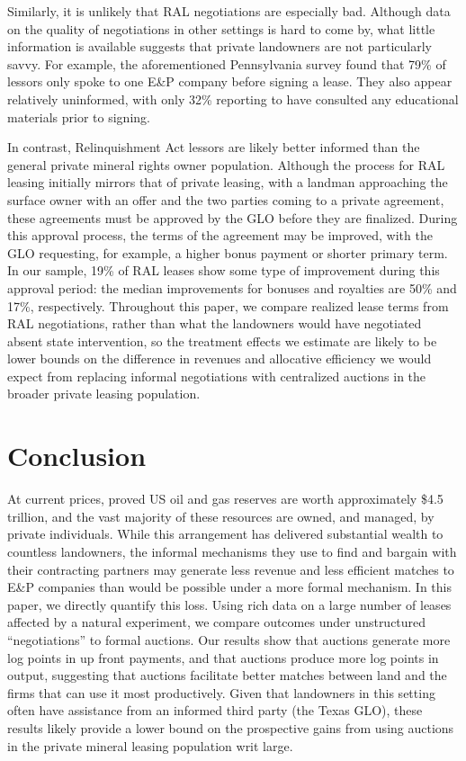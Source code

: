 \documentclass[12pt]{article}
\newcommand{\inputy}[1]{\unskip}
\begin{document}
Similarly, it is unlikely that RAL negotiations are especially bad.  Although data on the quality of negotiations in other settings is hard to come by, what little information is available suggests that private landowners are not particularly savvy.  For example, the aforementioned Pennsylvania survey found that 79\% of lessors only spoke to one E\&P company before signing a lease. They also appear relatively uninformed, with only 32\% reporting to have consulted any educational materials prior to signing. 

In contrast, Relinquishment Act lessors are likely better informed than the general private mineral rights owner population. Although the process for RAL leasing initially mirrors that of private leasing, with a landman approaching the surface owner with an offer and the two parties coming to a private agreement, these agreements must be approved by the GLO before they are finalized. During this approval process, the terms of the agreement may be improved, with the GLO requesting, for example, a higher bonus payment or shorter primary term. In our sample, 19\% of RAL leases show some type of improvement during this approval period: the median improvements for bonuses and royalties are 50\% and 17\%, respectively. Throughout this paper, we compare realized lease terms from RAL negotiations, rather than what the landowners would have negotiated absent state intervention, so the treatment effects we estimate are likely to be lower bounds on the difference in revenues and allocative efficiency we would expect from replacing informal negotiations with centralized auctions in the broader private leasing population.

\section{Conclusion}\label{sec:Conclusion}

At current prices, proved US oil and gas reserves are worth approximately \$4.5 trillion, and the vast majority of these resources are owned, and managed, by private individuals.  While this arrangement has delivered substantial wealth to countless landowners, the informal mechanisms they use to find and bargain with their contracting partners may generate less revenue and less efficient matches to E\&P companies than would be possible under a more formal mechanism.  In this paper, we directly quantify this loss.  Using rich data on a large number of leases affected by a natural experiment, we compare outcomes under unstructured ``negotiations'' to formal auctions.  Our results show that auctions generate \inputy{../output/estimates/Bonus_Grid10Yr_log.tex} more log points in up front payments, and that auctions produce \inputy{../output/estimates/Poisson_LeaseRevenue_Grid10Yr.tex} more log points in output, suggesting that auctions facilitate better matches between land and the firms that can use it most productively. Given that landowners in this setting often have assistance from an informed third party (the Texas GLO), these results likely provide a lower bound on the prospective gains from using auctions in the private mineral leasing population writ large. 
\end{document}
